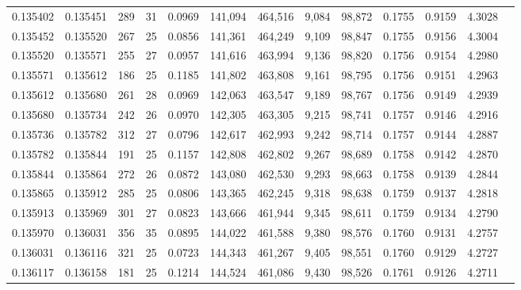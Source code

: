 \begin{tabular}{rrrrrrrrrrrrr}
0.135402 & 0.135451 & 289 &  31 &                                     0.0969 & 141,094 & 464,516 &   9,084 &  98,872 & 0.1755 & 0.9159 & 4.3028 \\
0.135452 & 0.135520 & 267 &  25 &                                     0.0856 & 141,361 & 464,249 &   9,109 &  98,847 & 0.1755 & 0.9156 & 4.3004 \\
0.135520 & 0.135571 & 255 &  27 &                                     0.0957 & 141,616 & 463,994 &   9,136 &  98,820 & 0.1756 & 0.9154 & 4.2980 \\
0.135571 & 0.135612 & 186 &  25 &                                     0.1185 & 141,802 & 463,808 &   9,161 &  98,795 & 0.1756 & 0.9151 & 4.2963 \\
0.135612 & 0.135680 & 261 &  28 &                                     0.0969 & 142,063 & 463,547 &   9,189 &  98,767 & 0.1756 & 0.9149 & 4.2939 \\
0.135680 & 0.135734 & 242 &  26 &                                     0.0970 & 142,305 & 463,305 &   9,215 &  98,741 & 0.1757 & 0.9146 & 4.2916 \\
0.135736 & 0.135782 & 312 &  27 &                                     0.0796 & 142,617 & 462,993 &   9,242 &  98,714 & 0.1757 & 0.9144 & 4.2887 \\
0.135782 & 0.135844 & 191 &  25 &                                     0.1157 & 142,808 & 462,802 &   9,267 &  98,689 & 0.1758 & 0.9142 & 4.2870 \\
0.135844 & 0.135864 & 272 &  26 &                                     0.0872 & 143,080 & 462,530 &   9,293 &  98,663 & 0.1758 & 0.9139 & 4.2844 \\
0.135865 & 0.135912 & 285 &  25 &                                     0.0806 & 143,365 & 462,245 &   9,318 &  98,638 & 0.1759 & 0.9137 & 4.2818 \\
0.135913 & 0.135969 & 301 &  27 &                                     0.0823 & 143,666 & 461,944 &   9,345 &  98,611 & 0.1759 & 0.9134 & 4.2790 \\
0.135970 & 0.136031 & 356 &  35 &                                     0.0895 & 144,022 & 461,588 &   9,380 &  98,576 & 0.1760 & 0.9131 & 4.2757 \\
0.136031 & 0.136116 & 321 &  25 &                                     0.0723 & 144,343 & 461,267 &   9,405 &  98,551 & 0.1760 & 0.9129 & 4.2727 \\
0.136117 & 0.136158 & 181 &  25 &                                     0.1214 & 144,524 & 461,086 &   9,430 &  98,526 & 0.1761 & 0.9126 & 4.2711 \\

\end{tabular}
